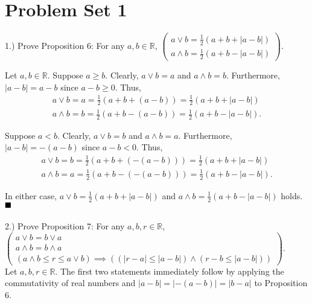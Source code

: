 \documentclass{book}
\newcommand{\setbackgroundcolour}{\pagecolor[rgb]{0.2,0.2,0.2}}
\newcommand{\settextcolour}{\color[rgb]{0.8,0.8,0.8}}
\newcommand{\invertbackgroundtext}{\setbackgroundcolour\settextcolour}
\begin{document}
\invertbackgroundtext
\setlength{\parindent}{0pt}

\section{Problem Set 1}
1.) Prove Proposition 6: For any $a, b \in \mathbb{R}$,
$\left(\begin{array}{ll}
    a \lor b = \frac{1}{2}(a + b + |a - b|)
\\  a \land b = \frac{1}{2}(a + b - |a - b|)
\end{array}\right)$.

Let $a, b \in \mathbb{R}$. Suppose $a \geq b$. Clearly, $a \lor b = a$ and $a \land b = b$. Furthermore, $|a - b| = a - b$ since $a - b \geq 0$. Thus, 
\begin{align}
    a \lor b = a = \frac{1}{2}(a + b + (a - b)) = \frac{1}{2}(a + b + |a - b|)
\\  a \land b = b = \frac{1}{2}(a + b - (a - b)) = \frac{1}{2}(a + b - |a - b|).
\end{align}

Suppose $a < b$. Clearly, $a \lor b = b$ and $a \land b = a$. Furthermore, $|a - b| = -(a - b)$ since $a - b < 0$. Thus, 
\begin{align}
    a \lor b = b = \frac{1}{2}(a + b + (-(a - b))) = \frac{1}{2}(a + b + |a - b|)
\\  a \land b = a = \frac{1}{2}(a + b - (-(a - b))) = \frac{1}{2}(a + b - |a - b|).
\end{align}

In either case, $a \lor b = \frac{1}{2}(a + b + |a - b|)$ and $a \land b = \frac{1}{2}(a + b - |a - b|)$ holds.
$\hfill \blacksquare$ \\ \\


2.) Prove Proposition 7: For any $a, b, r \in \mathbb{R}$,
$\left(\begin{array}{ll}
    a \lor b = b \lor a
\\  a \land b = b \land a
\\  (a \land b \leq r \leq a \lor b) \implies ((|r - a| \leq |a - b|) \land (r - b \leq |a - b|))
\end{array}\right)$. \\

Let $a, b, r \in \mathbb{R}$. The first two statements immediately follow by applying the commutativity of real numbers and $|a - b| = |-(a - b)| = |b - a|$ to Proposition 6. \\
\end{document}
